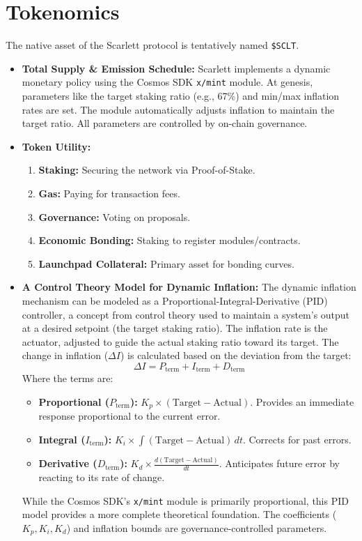\documentclass[10pt]{article}
\begin{document}
\section{Tokenomics}
The native asset of the Scarlett protocol is tentatively named \texttt{\$SCLT}.
\begin{itemize}[leftmargin=*, itemsep=2pt]
    \item \textbf{Total Supply \& Emission Schedule:} Scarlett implements a dynamic monetary policy using the Cosmos SDK \texttt{x/mint} module. At genesis, parameters like the target staking ratio (e.g., 67\%) and min/max inflation rates are set. The module automatically adjusts inflation to maintain the target ratio. All parameters are controlled by on-chain governance.
    
    \item \textbf{Token Utility:}
    \begin{enumerate}[leftmargin=*, itemsep=2pt]
        \item \textbf{Staking:} Securing the network via Proof-of-Stake.
        \item \textbf{Gas:} Paying for transaction fees.
        \item \textbf{Governance:} Voting on proposals.
        \item \textbf{Economic Bonding:} Staking to register modules/contracts.
        \item \textbf{Launchpad Collateral:} Primary asset for bonding curves.
    \end{enumerate}
    \item \textbf{A Control Theory Model for Dynamic Inflation:} The dynamic inflation mechanism can be modeled as a Proportional-Integral-Derivative (PID) controller, a concept from control theory used to maintain a system's output at a desired setpoint (the target staking ratio). The inflation rate is the actuator, adjusted to guide the actual staking ratio toward its target. The change in inflation (\(\Delta I\)) is calculated based on the deviation from the target:
    \[ \Delta I = P_{\text{term}} + I_{\text{term}} + D_{\text{term}} \]
    Where the terms are:
    \begin{itemize}
        \item \textbf{Proportional (\(P_{\text{term}}\)):} \(K_p \times (\text{Target} - \text{Actual})\). Provides an immediate response proportional to the current error.
        \item \textbf{Integral (\(I_{\text{term}}\)):} \(K_i \times \int (\text{Target} - \text{Actual}) \,dt\). Corrects for past errors.
        \item \textbf{Derivative (\(D_{\text{term}}\)):} \(K_d \times \frac{d(\text{Target} - \text{Actual})}{dt}\). Anticipates future error by reacting to its rate of change.
    \end{itemize}
    While the Cosmos SDK's \texttt{x/mint} module is primarily proportional, this PID model provides a more complete theoretical foundation. The coefficients (\(K_p, K_i, K_d\)) and inflation bounds are governance-controlled parameters.
\end{itemize}
\end{document}

